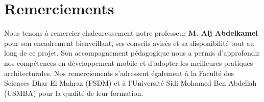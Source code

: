 \chapter*{Remerciements}

Nous tenons à remercier chaleureusement notre professeur \textbf{M. Alj Abdelkamel} pour son encadrement bienveillant, ses conseils avisés et sa disponibilité tout au long de ce projet. Son accompagnement pédagogique nous a permis d'approfondir nos compétences en développement mobile et d'adopter les meilleures pratiques architecturales. Nos remerciements s'adressent également à la Faculté des Sciences Dhar El Mahraz (FSDM) et à l'Université Sidi Mohamed Ben Abdellah (USMBA) pour la qualité de leur formation.
